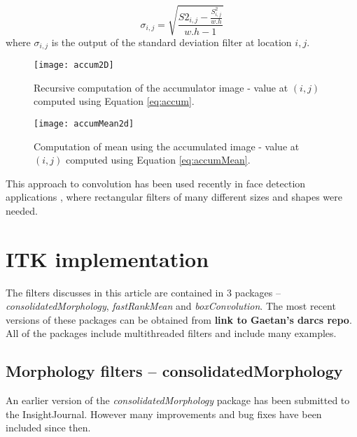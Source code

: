 \documentclass{InsightArticle}
\begin{document}
\begin{equation}
\label{eq:accumSigma}
\sigma_{i,j} = \sqrt{\frac{S2_{i,j} - \frac{S_{i,j}^2}{w.h}}{w.h-1}}
\end{equation}
where $\sigma_{i,j}$ is the output of the standard deviation filter at location $i,j$.

\begin{figure}[htbp]
\centering
\texttt{[image: accum2D]}
\caption{Recursive computation of the accumulator image - value at $(i,j)$ computed using Equation \ref{eq:accum}.\label{fig:accum}}
\end{figure}

\begin{figure}[htbp]
\centering
\texttt{[image: accumMean2d]}
\caption{Computation of mean using the accumulated image - value at $(i,j)$ computed using Equation \ref{eq:accumMean}.\label{fig:accumMean}}
\end{figure}

This approach to convolution has been used recently in face detection
applications \cite{Viola2004}, where rectangular filters of many
different sizes and shapes were needed.

\section{ITK implementation}
The filters discusses in this article are contained in 3 packages --
{\em consolidatedMorphology}, {\em fastRankMean} and {\em
boxConvolution}. The most recent versions of these packages can be
obtained from {\bf link to Gaetan's darcs repo}. All of the packages
include multithreaded filters and include many examples.

\subsection{Morphology filters -- consolidatedMorphology}
An earlier version of the {\em consolidatedMorphology} package has
been submitted to the InsightJournal. However many improvements and
bug fixes have been included since then.
\end{document}
